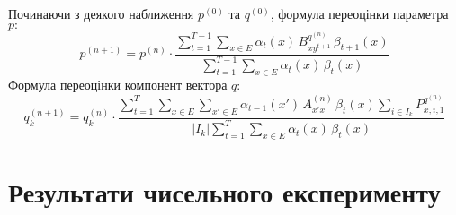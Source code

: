 \documentclass[12pt,mathserif]{beamer}
\newcommand*{\scaleq}[2][4]{\scalebox{#1}{$#2$}}
\theoremstyle{plain}
\newtheorem{claim}{\indent Твердження}
\begin{document}


\begin{frame}[t]
    \frametitle{\insertsection}
    Починаючи з деякого наближення $p^{(0)}$ та $q^{(0)}$, формула переоцінки параметра $p:$
    \begin{equation*}
        p^{(n+1)} = p^{(n)}\cdot\frac{\sum\limits_{t=1}^{T-1}\sum\limits_{x \in E} \alpha_t(x)\,B^{q^{(n)}}_{xy^{t+1}}\,\beta_{t+1}(x)}{\sum\limits_{t=1}^{T-1}\sum\limits_{x \in E} \alpha_t(x)\,\beta_t(x)}
    \end{equation*}
    Формула переоцінки компонент вектора $q:$
    \begin{equation*}
        q_k^{(n+1)} = q_k^{(n)}\cdot\frac{\sum\limits_{t=1}^{T}\sum\limits_{x \in E}\sum\limits_{x' \in E} \alpha_{t-1}(x')\,A^{(n)}_{x'x}\,\beta_{t}(x)\sum\limits_{i \in I_k}P^{q^{(n)}}_{x,i,1}}{|I_k|\sum\limits_{t=1}^{T}\sum\limits_{x \in E} \alpha_t(x)\,\beta_t(x)}
    \end{equation*}
\end{frame}

\section{Результати чисельного експерименту}
\end{document}
